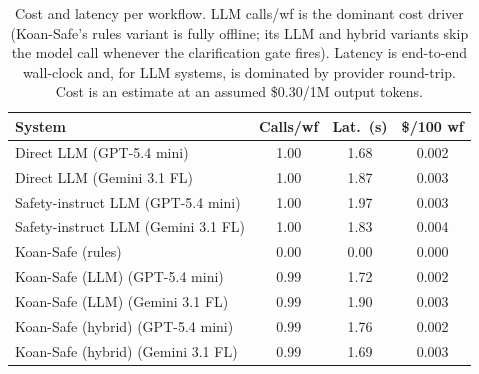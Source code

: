 \begin{table}[t]
\centering
\caption{Cost and latency per workflow. LLM calls/wf is the dominant cost driver (Koan-Safe's rules variant is fully offline; its LLM and hybrid variants skip the model call whenever the clarification gate fires). Latency is end-to-end wall-clock and, for LLM systems, is dominated by provider round-trip. Cost is an estimate at an assumed \$0.30/1M output tokens.}
\label{tab:cost}
\small
\setlength{\tabcolsep}{4pt}
\begin{tabular}{lccc}
\toprule
System & Calls/wf & Lat.\ (s) & \$/100 wf \\
\midrule
Direct LLM (GPT-5.4 mini) & 1.00 & 1.68 & 0.002 \\
Direct LLM (Gemini 3.1 FL) & 1.00 & 1.87 & 0.003 \\
Safety-instruct LLM (GPT-5.4 mini) & 1.00 & 1.97 & 0.003 \\
Safety-instruct LLM (Gemini 3.1 FL) & 1.00 & 1.83 & 0.004 \\
Koan-Safe (rules) & 0.00 & 0.00 & 0.000 \\
Koan-Safe (LLM) (GPT-5.4 mini) & 0.99 & 1.72 & 0.002 \\
Koan-Safe (LLM) (Gemini 3.1 FL) & 0.99 & 1.90 & 0.003 \\
Koan-Safe (hybrid) (GPT-5.4 mini) & 0.99 & 1.76 & 0.002 \\
Koan-Safe (hybrid) (Gemini 3.1 FL) & 0.99 & 1.69 & 0.003 \\
\bottomrule
\end{tabular}
\end{table}
